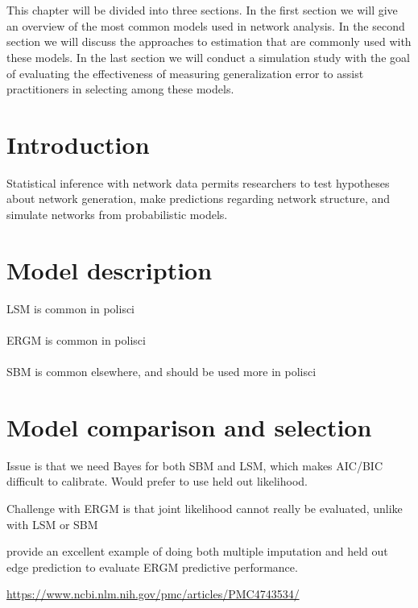 \documentclass[fleqn,12pt]{wlscirep}
\begin{document}
\\~\\
 This chapter will be divided into three sections. In the first section we will give an overview of the most common models used in network analysis. In the second section we will discuss the approaches to estimation that are commonly used with these models. In the last section we will conduct a simulation study with the goal of evaluating the effectiveness of measuring generalization error to assist practitioners in selecting among these models.

\section{Introduction}

Statistical inference with network data permits researchers to test hypotheses about network generation, make predictions regarding network structure, and simulate networks from probabilistic models. 

\section{Model description}

LSM is common in polisci \\~\\
ERGM is common in polisci \\~\\
SBM is common elsewhere, and should be used more in polisci

\section{Model comparison and selection}

Issue is that we need Bayes for both SBM and LSM, which makes AIC/BIC difficult to calibrate. Would prefer to use held out likelihood.

Challenge with ERGM is that joint likelihood cannot really be evaluated, unlike with LSM or SBM

\citet{wang2016multiple} provide an excellent example of doing both multiple imputation and held out edge prediction to evaluate ERGM predictive performance.

\url{https://www.ncbi.nlm.nih.gov/pmc/articles/PMC4743534/}



\end{document}
